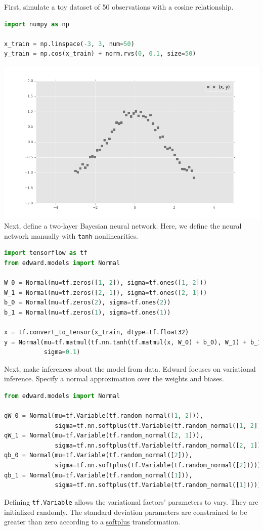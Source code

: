First, simulate a toy dataset of 50 observations with a cosine relationship.
\begin{lstlisting}[language=Python]
import numpy as np

x_train = np.linspace(-3, 3, num=50)
y_train = np.cos(x_train) + norm.rvs(0, 0.1, size=50)
\end{lstlisting}
\includegraphics[width=700px]{images/getting-started-fig0.png}
Next, define a two-layer Bayesian neural network. Here, we
define the neural network manually with \texttt{tanh} nonlinearities.
\begin{lstlisting}[language=Python]
import tensorflow as tf
from edward.models import Normal

W_0 = Normal(mu=tf.zeros([1, 2]), sigma=tf.ones([1, 2]))
W_1 = Normal(mu=tf.zeros([2, 1]), sigma=tf.ones([2, 1]))
b_0 = Normal(mu=tf.zeros(2), sigma=tf.ones(2))
b_1 = Normal(mu=tf.zeros(1), sigma=tf.ones(1))

x = tf.convert_to_tensor(x_train, dtype=tf.float32)
y = Normal(mu=tf.matmul(tf.nn.tanh(tf.matmul(x, W_0) + b_0), W_1) + b_1,
           sigma=0.1)
\end{lstlisting}
Next, make inferences about the model from data.
Edward focuses on variational inference. Specify a normal
approximation over the weights and biases.
\begin{lstlisting}[language=Python]
from edward.models import Normal

qW_0 = Normal(mu=tf.Variable(tf.random_normal([1, 2])),
              sigma=tf.nn.softplus(tf.Variable(tf.random_normal([1, 2]))))
qW_1 = Normal(mu=tf.Variable(tf.random_normal([2, 1])),
              sigma=tf.nn.softplus(tf.Variable(tf.random_normal([2, 1]))))
qb_0 = Normal(mu=tf.Variable(tf.random_normal([2])),
              sigma=tf.nn.softplus(tf.Variable(tf.random_normal([2]))))
qb_1 = Normal(mu=tf.Variable(tf.random_normal([1])),
              sigma=tf.nn.softplus(tf.Variable(tf.random_normal([1]))))
\end{lstlisting}
Defining \texttt{tf.Variable} allows the variational factors'
parameters to vary. They are initialized randomly.  The standard
deviation parameters are constrained to be greater than zero according
to a
\href{https://en.wikipedia.org/wiki/Rectifier_(neural_networks)}{softplus}
transformation.

